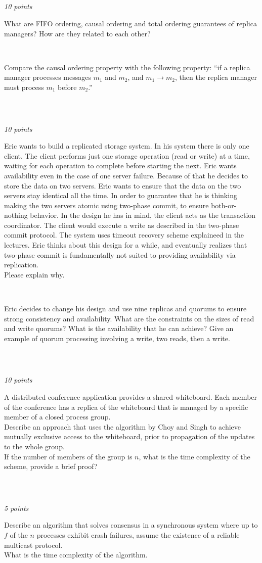 \documentclass[a4paper]{article}
\newcommand{\points}[1]{\subsection{} \textit{#1 points}\\}
\newcommand{\question}[2][]{
  \parbox[t]{\textwidth}{
    \ifthenelse{\equal{#1}{}}{}{#1)}
    \parbox[t]{0.95\textwidth}{#2}}\\}
\begin{document}
\points{10}
\question[a]{What are FIFO ordering, causal ordering and total
  ordering guarantees of replica managers? How are they related to
  each other?}
\question[b]{Compare the causal ordering property with the following
property: ``if a replica manager processes messages $m_1$ and $m_2$,
and $m_1 \rightarrow m_2$, then the replica manager must process $m_1$
before $m_2$.''}

\points{10}
\question[a]{Eric wants to build a replicated storage system. In his
  system there is only one client. The client performs just one
  storage operation (read or write) at a time, waiting for each
  operation to complete before starting the next. Eric wants
  availability even in the case of one server failure. Because of that
  he decides to store the data on two servers. Eric wants to ensure
  that the data on the two servers stay identical all the time. In
  order to guarantee that he is thinking making the two servers atomic
  using two-phase commit, to ensure both-or-nothing behavior. In the
  design he has in mind, the client acts as the transaction
  coordinator. The client would execute a write as described in the
  two-phase commit protocol. The system uses timeout recovery scheme
  explaineed in the lectures. Eric thinks about this design for a
  while, and eventually realizes that two-phase commit is
  fundamentally not suited to providing availability via
  replication. \\
  Please explain why.}
\question[b]{Eric decides to change his design and use nine replicas
  and quorums to ensure strong consistency and availability. What are
  the constraints on the sizes of read and write quorums? What is the
  availability that he can achieve? Give an example of quorum
  processing involving a write, two reads, then a write.}


\points{10}
\question{A distributed conference application provides a shared
  whiteboard. Each member of the conference has a replica of the
  whiteboard that is managed by a specific member of a closed process
  group. \\
  Describe an approach that uses the algorithm by Choy and Singh to
  achieve mutually exclusive access to the whiteboard, prior to
  propagation of the updates to the whole group. \\
  If the number of members of the group is $n$, what is the time
  complexity of the scheme, provide a brief proof?}

\points{5}
\question{Describe an algorithm that solves consensus in a synchronous
  system where up to $f$ of the $n$ processes exhibit crash failures,
  assume the existence of a reliable multicast protocol. \\
  What is the time complexity of the algorithm.}
\end{document}
